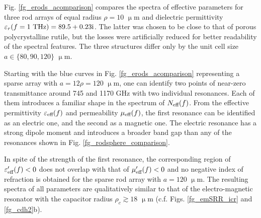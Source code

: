 Fig. \ref{fg_erods_acomparison} compares the spectra of effective parameters for three rod arrays of equal radius $\rho=10$ $\upmu$m and dielectric permittivity $\varepsilon_r(f=1\text{ THz}) = 89.5+0.23{\mathrm i}$. The latter was chosen to be close to that of porous polycrystalline rutile, but the losses were artificially reduced for better readability of the spectral features. The three structures differ only by the unit cell size $a \in \{80, 90, 120\}$ $\upmu$m. %

Starting with the blue curves in Fig. \ref{fg_erods_acomparison} representing a sparse array with $a=12\rho = 120$ $\upmu$m, one can identify two points of near-zero transmittance around 745 and 1170 GHz with two individual resonances. Each of them introduces a familiar shape in the spectrum of $N_{\text{eff} }(f)$. From the effective permittivity $\varepsilon_{\text{eff} }(f)$ and permeability $\mu_{\text{eff} }(f)$, the first resonance can be identified as an electric one, and the second as a magnetic one. The electric resonance has a strong dipole moment and introduces a broader band gap than any of the resonances shown in Fig. \ref{fg_rodsphere_comparison}. %

In spite of the strength of the first resonance, the corresponding region of $\varepsilon_{\text{eff} }'(f)<0$ does not overlap with that of $\mu_{\text{eff} }'(f)<0$ and no negative index of refraction is obtained  for the sparse rod array with $a=120$ $\upmu$m. The resulting spectra of all parameters are qualitatively similar to that of the electro-magnetic resonator with the capacitor radius $\rho_c\gtrsim 18$ $\upmu$m  (c.f. Figs. \ref{fg_emSRR_icr} and \ref{fg_cdh2}b).

